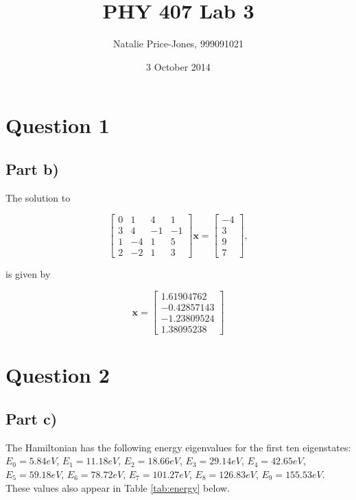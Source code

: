 \documentclass[a4paper,12pt]{article}
\begin{document}
\onehalfspacing
\title{PHY 407 Lab 3}
\author{Natalie Price-Jones, 999091021}
\date{3 October 2014}
\maketitle

\section{Question 1}

\subsection{Part b)}

The solution to

\[
\left[ \begin{array}{cccc}
0 & 1 & 4 & 1\\
3 & 4 & -1 & -1\\
1 & -4 & 1 & 5\\
2 & -2 & 1 & 3
\end{array} \right]
\mathbf{x} = 
\left[ \begin{array}{c}
-4 \\ 3 \\ 9 \\ 7
\end{array}\right],
\]

is given by 

\[
\mathbf{x} = \left[ \begin{array}{c}
 1.61904762 \\ -0.42857143 \\ -1.23809524 \\ 1.38095238
\end{array}\right]
\]

\section{Question 2}

\subsection{Part c)}

The Hamiltonian has the following energy eigenvalues for the first ten eigenstates: $E_0 = 5.84 eV$, $E_1 = 11.18eV$, $E_2 = 18.66 eV$, $E_3 = 29.14 eV$, $E_4 = 42.65 eV$, $E_5 = 59.18 eV$, $E_6 = 78.72 eV$, $E_7 = 101.27 eV$, $E_8 =   126.83 eV$, $E_9 = 155.53 eV$. These values also appear in Table \ref{tab:energy} below.
\end{document}
